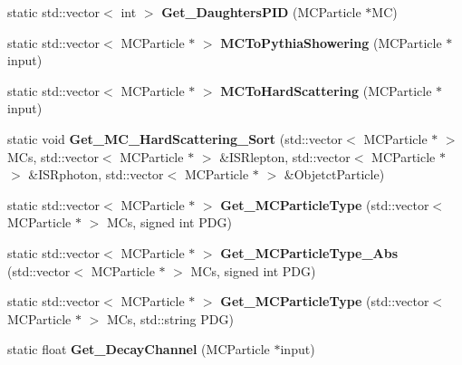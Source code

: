 \begin{DoxyCompactItemize}
\item 
\hypertarget{classToolSet_1_1CMC_ae0aeb5054574c5c8ffd3f24e86d662a6}{
static std::vector$<$ int $>$ {\bfseries Get\_\-DaughtersPID} (MCParticle $\ast$MC)}
\label{classToolSet_1_1CMC_ae0aeb5054574c5c8ffd3f24e86d662a6}

\item 
\hypertarget{classToolSet_1_1CMC_a38ef7e0f75f14714d4636ca70c1b717c}{
static std::vector$<$ MCParticle $\ast$ $>$ {\bfseries MCToPythiaShowering} (MCParticle $\ast$input)}
\label{classToolSet_1_1CMC_a38ef7e0f75f14714d4636ca70c1b717c}

\item 
\hypertarget{classToolSet_1_1CMC_adfd54e8274a8994f4cc0a531a028cd01}{
static std::vector$<$ MCParticle $\ast$ $>$ {\bfseries MCToHardScattering} (MCParticle $\ast$input)}
\label{classToolSet_1_1CMC_adfd54e8274a8994f4cc0a531a028cd01}

\item 
\hypertarget{classToolSet_1_1CMC_abf41aa5efde937a3e21fa3b24323d570}{
static void {\bfseries Get\_\-MC\_\-HardScattering\_\-Sort} (std::vector$<$ MCParticle $\ast$ $>$ MCs, std::vector$<$ MCParticle $\ast$ $>$ \&ISRlepton, std::vector$<$ MCParticle $\ast$ $>$ \&ISRphoton, std::vector$<$ MCParticle $\ast$ $>$ \&ObjetctParticle)}
\label{classToolSet_1_1CMC_abf41aa5efde937a3e21fa3b24323d570}

\item 
\hypertarget{classToolSet_1_1CMC_a0595ad7853b51cfc631547665a3cb63e}{
static std::vector$<$ MCParticle $\ast$ $>$ {\bfseries Get\_\-MCParticleType} (std::vector$<$ MCParticle $\ast$ $>$ MCs, signed int PDG)}
\label{classToolSet_1_1CMC_a0595ad7853b51cfc631547665a3cb63e}

\item 
\hypertarget{classToolSet_1_1CMC_a8a83c548d4fa19b657194f055f5084db}{
static std::vector$<$ MCParticle $\ast$ $>$ {\bfseries Get\_\-MCParticleType\_\-Abs} (std::vector$<$ MCParticle $\ast$ $>$ MCs, signed int PDG)}
\label{classToolSet_1_1CMC_a8a83c548d4fa19b657194f055f5084db}

\item 
\hypertarget{classToolSet_1_1CMC_a186078318b357a23930ab6b61c8d9494}{
static std::vector$<$ MCParticle $\ast$ $>$ {\bfseries Get\_\-MCParticleType} (std::vector$<$ MCParticle $\ast$ $>$ MCs, std::string PDG)}
\label{classToolSet_1_1CMC_a186078318b357a23930ab6b61c8d9494}

\item 
\hypertarget{classToolSet_1_1CMC_aa16a7d3c1cbd3e1d25cf885b25d561ec}{
static float {\bfseries Get\_\-DecayChannel} (MCParticle $\ast$input)}
\label{classToolSet_1_1CMC_aa16a7d3c1cbd3e1d25cf885b25d561ec}


\end{DoxyCompactItemize}
